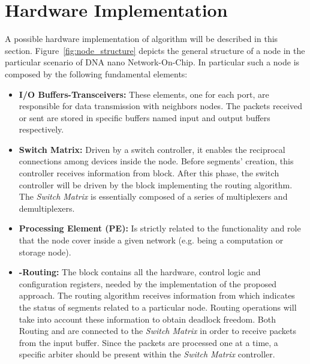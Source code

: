\section{Hardware Implementation}
\label{sec:implementation}

A possible hardware implementation of \disr{} algorithm will be
described in this section. Figure~\ref{fig:node_structure} depicts the general
structure of a node in the particular scenario of DNA nano Network-On-Chip. In particular such a node
is composed by the following fundamental elements:

\begin{itemize}%

	\item \textbf{I/O Buffers-Transceivers:} These elements, one for
	each port,  are responsible for data transmission with neighbors
	nodes. The packets received or sent are stored in specific buffers
	named input and output buffers respectively.

	\item \textbf{Switch Matrix:} Driven by a switch controller, it enables the
	reciprocal connections among devices inside the node. Before segments'
	creation, this controller receives information from
	\disr{} block. After this phase, the switch controller will be driven by
	the block implementing the routing algorithm. The \emph{Switch Matrix} is
	essentially composed of a series of multiplexers and demultiplexers.

	\item  \textbf{Processing Element (PE):} Is strictly related to the
	functionality and role that the node cover inside a given network (e.g. being a
	computation or storage node).

	\item \textbf{\disr{}-Routing:} The \disr{} block contains all the hardware, control
	logic and configuration registers, needed by the implementation of the
	proposed approach. The routing algorithm receives information
	from \disr{}  which indicates the status of segments related to a
	particular node. Routing operations will take into account these
	information to obtain deadlock freedom. Both Routing
	and \disr{} are connected to the \emph{Switch Matrix} in order to receive
	packets from the input buffer. Since the packets are processed one at
	a time, a specific arbiter should be present within the \emph{Switch Matrix}
	controller. 

\end{itemize}%

